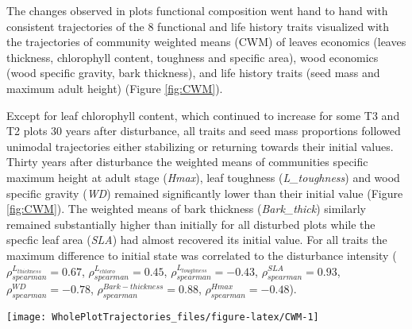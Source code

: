 \documentclass[fleqn,10pt]{ArtEcoFoG} %
\theoremstyle{definition}
\theoremstyle{definition}
\theoremstyle{definition}
\theoremstyle{remark}
\begin{document}
The changes observed in plots functional composition went hand to hand
with consistent trajectories of the 8 functional and life history traits
visualized with the trajectories of community weighted means (CWM) of
leaves economics (leaves thickness, chlorophyll content, toughness and
specific area), wood economics (wood specific gravity, bark thickness),
and life history traits (seed mass and maximum adult height) (Figure
\ref{fig:CWM}).

Except for leaf chlorophyll content, which continued to increase for
some T3 and T2 plots 30 years after disturbance, all traits and seed
mass proportions followed unimodal trajectories either stabilizing or
returning towards their initial values. Thirty years after disturbance
the weighted means of communities specific maximum height at adult stage
(\emph{Hmax}), leaf toughness (\emph{L\_toughness}) and wood specific
gravity (\emph{WD}) remained significantly lower than their initial
value (Figure \ref{fig:CWM}). The weighted means of bark thickness
(\emph{Bark\_thick}) similarly remained substantially higher than
initially for all disturbed plots while the specfic leaf area
(\emph{SLA}) had almost recovered its initial value. For all traits the
maximum difference to initial state was correlated to the disturbance
intensity (\(\rho_{spearman}^{L_{thickness}}=0.67\),
\(\rho_{spearman}^{L_{chloro}}=0.45\),
\(\rho_{spearman}^{L_{toughness}}=-0.43\),
\(\rho_{spearman}^{SLA}=0.93\), \(\rho_{spearman}^{WD}=-0.78\),
\(\rho_{spearman}^{Bark-thickness}=0.88\),
\(\rho_{spearman}^{Hmax}=-0.48\)).

\begin{figure*}

{\centering \texttt{[image: WholePlotTrajectories\_files/figure-latex/CWM-1]} 

}

\caption{Trajectories of the communities weighted means (CWM) over 30 years after disturbance of 4 leaf traits (Leaf thickness, \emph{L\_thickness}, chlorophyll content, \emph{L\_chloro}, toughness, \emph{L\_toughness} and specific area, \emph{SLA}), 2 stem traits (wood specific gravity, \emph{WD}, and bark thickness, \emph{Bark-thick}) and one life history trait (Specific maximum height at adult stage, \emph{Hmax}). Trajectories correspond to the median (solid line) and 0.025 and 0.975 percentile (gray envelope) observed after 50 iterations of the taxonomic uncertainty propagation and the filling processes of missing trait values. Initial treatments are represented by solid lines colors with green for control, blue for T1,orange for T2 and red for T3.}\label{fig:CWM}
\end{figure*}
\end{document}
